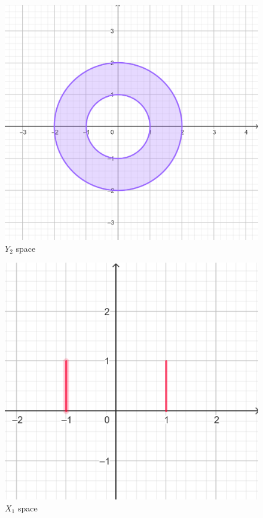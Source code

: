 \documentclass[12pt]{article}
\begin{document}
\begin{figure}
	\centering
	\includegraphics[scale=0.20] {graph11}
	\caption{\label{fig:11} $Y_{2}$ space}
\end{figure}

\begin{figure}
	\centering
	\includegraphics[scale=0.20] {graph12}
	\caption{\label{fig:12} $X_{1}$ space }
\end{figure}
\end{document}
